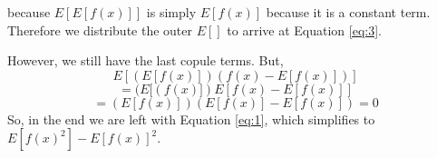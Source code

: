 \documentclass{article}
\begin{document}
		because $E[E[f(x)]]$ is simply $E[f(x)]$ because it is a constant term. Therefore we distribute the outer
		$E[]$ to arrive at Equation \ref{eq:3}.

		However, we still have the last copule terms. But,
		\[ E[(E[f(x)])(f(x) - E[f(x)])]\]
		\[ = (E[(f(x)])E[f(x) - E[f(x)]]\]
		\[ = (E[f(x)])(E[f(x)] - E[f(x)]) = 0\]
		So, in the end we are left with Equation \ref{eq:1}, which simplifies to $E[f(x)^{2}] - E[f(x)]^{2}$.
\end{document}
